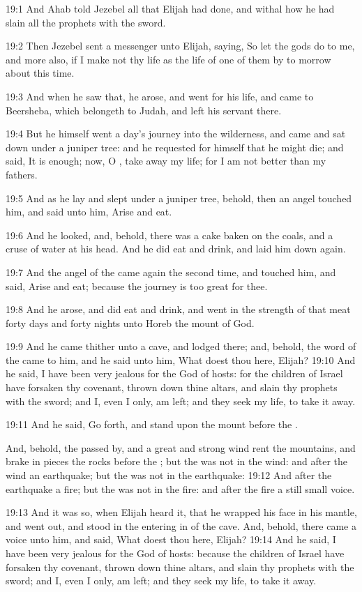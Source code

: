 19:1 And Ahab told Jezebel all that Elijah had done, and withal how he
had slain all the prophets with the sword.

19:2 Then Jezebel sent a messenger unto Elijah, saying, So let the
gods do to me, and more also, if I make not thy life as the life of
one of them by to morrow about this time.

19:3 And when he saw that, he arose, and went for his life, and came
to Beersheba, which belongeth to Judah, and left his servant there.

19:4 But he himself went a day's journey into the wilderness, and came
and sat down under a juniper tree: and he requested for himself that
he might die; and said, It is enough; now, O \LORD, take away my life;
for I am not better than my fathers.

19:5 And as he lay and slept under a juniper tree, behold, then an
angel touched him, and said unto him, Arise and eat.

19:6 And he looked, and, behold, there was a cake baken on the coals,
and a cruse of water at his head. And he did eat and drink, and laid
him down again.

19:7 And the angel of the \LORD came again the second time, and touched
him, and said, Arise and eat; because the journey is too great for
thee.

19:8 And he arose, and did eat and drink, and went in the strength of
that meat forty days and forty nights unto Horeb the mount of God.

19:9 And he came thither unto a cave, and lodged there; and, behold,
the word of the \LORD came to him, and he said unto him, What doest
thou here, Elijah?  19:10 And he said, I have been very jealous for
the \LORD God of hosts: for the children of Israel have forsaken thy
covenant, thrown down thine altars, and slain thy prophets with the
sword; and I, even I only, am left; and they seek my life, to take it
away.

19:11 And he said, Go forth, and stand upon the mount before the \LORD.

And, behold, the \LORD passed by, and a great and strong wind rent the
mountains, and brake in pieces the rocks before the \LORD; but the \LORD
was not in the wind: and after the wind an earthquake; but the \LORD
was not in the earthquake: 19:12 And after the earthquake a fire; but
the \LORD was not in the fire: and after the fire a still small voice.

19:13 And it was so, when Elijah heard it, that he wrapped his face in
his mantle, and went out, and stood in the entering in of the cave.
And, behold, there came a voice unto him, and said, What doest thou
here, Elijah?  19:14 And he said, I have been very jealous for the
\LORD God of hosts: because the children of Israel have forsaken thy
covenant, thrown down thine altars, and slain thy prophets with the
sword; and I, even I only, am left; and they seek my life, to take it
away.

